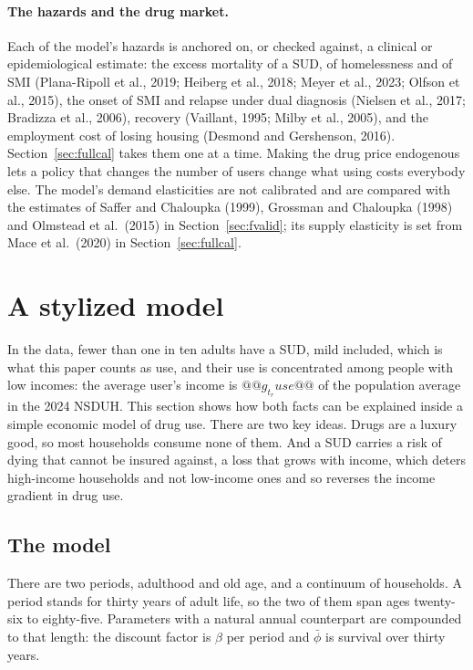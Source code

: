 \documentclass[10pt]{article}
\begin{document}
\paragraph{The hazards and the drug market.} Each of the model's hazards is anchored on, or checked against, a clinical or epidemiological estimate: the excess mortality of a SUD, of homelessness and of SMI (Plana-Ripoll et al., 2019; Heiberg et al., 2018; Meyer et al., 2023; Olfson et al., 2015), the onset of SMI and relapse under dual diagnosis (Nielsen et al., 2017; Bradizza et al., 2006), recovery (Vaillant, 1995; Milby et al., 2005), and the employment cost of losing housing (Desmond and Gershenson, 2016). Section~\ref{sec:fullcal} takes them one at a time. Making the drug price endogenous lets a policy that changes the number of users change what using costs everybody else. The model's demand elasticities are not calibrated and are compared with the estimates of Saffer and Chaloupka (1999), Grossman and Chaloupka (1998) and Olmstead et al.\ (2015) in Section~\ref{sec:fvalid}; its supply elasticity is set from Mace et al.\ (2020) in Section~\ref{sec:fullcal}.


\section{A stylized model}\label{sec:stylized}

In the data, fewer than one in ten adults have a SUD, mild included, which is what this paper counts as use, and their use is concentrated among people with low incomes: the average user's income is $@@g_t_ruse@@$ of the population average in the 2024 NSDUH. This section shows how both facts can be explained inside a simple economic model of drug use. There are two key ideas. Drugs are a luxury good, so most households consume none of them. And a SUD carries a risk of dying that cannot be insured against, a loss that grows with income, which deters high-income households and not low-income ones and so reverses the income gradient in drug use.

\subsection{The model}\label{sec:env}

There are two periods, adulthood and old age, and a continuum of households. A period stands for
thirty years of adult life, so the two of them span ages twenty-six to eighty-five.
Parameters with a natural annual counterpart are compounded to that length: the
discount factor is $\beta$ per period and $\bar\phi$ is survival over thirty years.
\end{document}
